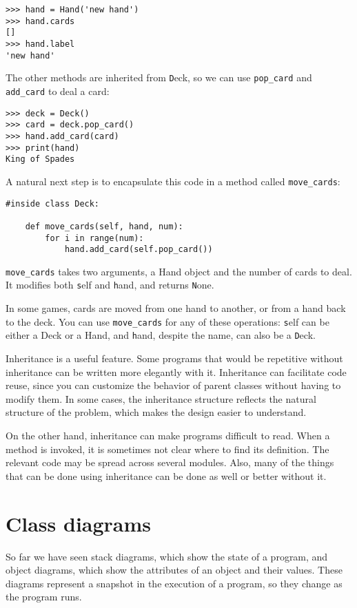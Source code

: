 \documentclass[
DIV=11,
fontsize=13,
twoside,
headinclude=false,
titlepage=firstiscover,
abstract=true,
headsepline=true,
footsepline=true,
chapterprefix=true, %
headings=big,
bibliography=totoc,%
captions=tableheading
]{scrbook}
\theoremstyle{definition}
\begin{document}
\begin{lstlisting}
>>> hand = Hand('new hand')
>>> hand.cards
[]
>>> hand.label
'new hand'
\end{lstlisting}
%
The other methods are inherited from {\texttt Deck}, so we can use
\verb"pop_card" and \verb"add_card" to deal a card:

\begin{lstlisting}
>>> deck = Deck()
>>> card = deck.pop_card()
>>> hand.add_card(card)
>>> print(hand)
King of Spades
\end{lstlisting}
%
A natural next step is to encapsulate this code in a method
called \verb"move_cards":

\begin{lstlisting}
#inside class Deck:

    def move_cards(self, hand, num):
        for i in range(num):
            hand.add_card(self.pop_card())
\end{lstlisting}
%
\verb"move_cards" takes two arguments, a Hand object and the number of
cards to deal.  It modifies both {\texttt self} and {\texttt hand}, and
returns {\texttt None}.

In some games, cards are moved from one hand to another,
or from a hand back to the deck.  You can use \verb"move_cards"
for any of these operations: {\texttt self} can be either a Deck
or a Hand, and {\texttt hand}, despite the name, can also be a {\texttt Deck}.

Inheritance is a useful feature.  Some programs that would be
repetitive without inheritance can be written more elegantly
with it.  Inheritance can facilitate code reuse, since you can
customize the behavior of parent classes without having to modify
them.  In some cases, the inheritance structure reflects the natural
structure of the problem, which makes the design easier to
understand.

On the other hand, inheritance can make programs difficult to read.
When a method is invoked, it is sometimes not clear where to find its
definition.  The relevant code may be spread across several modules.
Also, many of the things that can be done using inheritance can be
done as well or better without it.


\section{Class diagrams}
\label{class.diagram}

So far we have seen stack diagrams, which show the state of
a program, and object diagrams, which show the attributes
of an object and their values.  These diagrams represent a snapshot
in the execution of a program, so they change as the program
runs.
\end{document}

